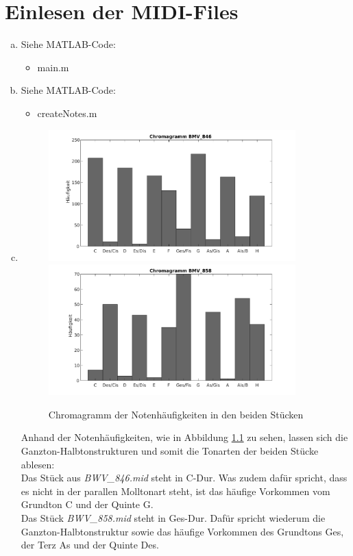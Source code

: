 \chapter{Einlesen der MIDI-Files}


\begin{enumerate}[a)]
\item
Siehe MATLAB-Code:
\begin{itemize}
\item
main.m
\end{itemize}

\item
Siehe MATLAB-Code:
\begin{itemize}
\item
createNotes.m
\end{itemize}
\item
\begin{figure}
  \centering
      \includegraphics[width=0.9\textwidth]{Figures/Chromagram1}
      \includegraphics[width=0.9\textwidth]{Figures/Chromagram2}
 \caption{Chromagramm der Notenhäufigkeiten in den beiden Stücken}
	\label{fig:chr}
\end{figure}
Anhand der Notenhäufigkeiten, wie in Abbildung \ref{fig:chr} zu sehen, lassen sich die Ganzton-Halbtonstrukturen und somit die Tonarten der beiden Stücke ablesen:\\
Das Stück aus \textit{BWV\_846.mid} steht in C-Dur. Was zudem dafür spricht, dass es nicht in der parallen Molltonart steht, ist das häufige Vorkommen vom Grundton C und der Quinte G.\\
Das Stück \textit{BWV\_858.mid} steht in Ges-Dur. Dafür spricht wiederum die Ganzton-Halbtonstruktur sowie das häufige Vorkommen des Grundtons Ges, der Terz As und der Quinte Des.
\end{enumerate}

